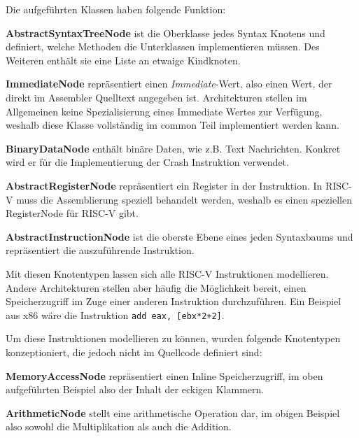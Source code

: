 \label{module-arch-ast-node-types}
Die aufgeführten Klassen haben folgende Funktion:
\begin{sitemize}{-0.4cm}
  \item \textbf{AbstractSyntaxTreeNode} ist die Oberklasse jedes Syntax Knotens
  und definiert, welche Methoden die Unterklassen implementieren müssen. Des
  Weiteren enthält sie eine Liste an etwaige Kindknoten.

  \item \textbf{ImmediateNode} repräsentiert einen \emph{Immediate}-Wert, also
  einen Wert, der direkt im Assembler Quelltext angegeben ist. Architekturen
  stellen im Allgemeinen keine Spezialisierung eines Immediate Wertes zur
  Verfügung, weshalb diese Klasse vollständig im common Teil implementiert
  werden kann.

  \item \textbf{BinaryDataNode} enthält binäre Daten, wie z.B. Text Nachrichten.
  Konkret wird er für die Implementierung der Crash Instruktion verwendet.

	\item \textbf{AbstractRegisterNode} repräsentiert ein Register in der
	Instruktion. In RISC-V muss die Assemblierung speziell behandelt werden,
	weshalb es einen speziellen RegisterNode für RISC-V gibt.

	\item \textbf{AbstractInstructionNode} ist die oberste Ebene eines jeden
	Syntaxbaums und repräsentiert die auszuführende Instruktion.
  \vspace{-0.2cm}
\end{sitemize}

Mit diesen Knotentypen lassen sich alle RISC-V Instruktionen modellieren. Andere
Architekturen stellen aber häufig die Möglichkeit bereit, einen Speicherzugriff
im Zuge einer anderen Instruktion durchzuführen. Ein Beispiel aus x86 wäre die
Instruktion \texttt{add eax, [ebx*2+2]}.

Um diese Instruktionen modellieren zu können, wurden folgende Knotentypen
konzeptioniert, die jedoch nicht im Quellcode definiert sind:
\begin{sitemize}{-0.4cm}
	\item \textbf{MemoryAccessNode} repräsentiert einen Inline Speicherzugriff,
	im oben aufgeführten Beispiel also der Inhalt der eckigen Klammern.
	\item \textbf{ArithmeticNode} stellt eine arithmetische Operation dar, im
	obigen Beispiel also sowohl die Multiplikation als auch die Addition.
  \vspace{-0.3cm}
\end{sitemize}


